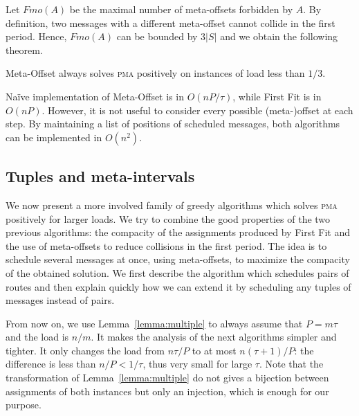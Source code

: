 \documentclass[a4paper,UKenglish,cleveref, autoref, thm-restate]{lipics-v2019}
\newcommand\pma{\textsc{pma}\xspace}
\begin{document}
Let $Fmo(A)$ be the maximal number of meta-offsets forbidden by $A$. 
 By definition, two messages with a different meta-offset cannot collide in the first period.
Hence, $Fmo(A)$ can be bounded by $3|S|$ and we obtain the following theorem.


\begin{theorem}
Meta-Offset always solves \pma positively on instances of load less than $1/3$.
\end{theorem}

Naïve implementation of Meta-Offset is in $O(n P/\tau)$, while First Fit is in $O(nP)$.
However, it is not useful to consider every possible (meta-)offset at each step. By maintaining
a list of positions of scheduled messages, both algorithms can be implemented in $O(n^2)$.

\subsection{Tuples and meta-intervals}

We now present a more involved family of greedy algorithms which 
solves \pma positively for larger loads. We try to combine the good properties of the two previous algorithms: the compacity of the assignments produced by First Fit and the use of meta-offsets to reduce collisions in the first period. The idea is to schedule several messages at once, using meta-offsets, to maximize the compacity of the obtained solution. 
We first describe the algorithm which schedules pairs of routes and then explain quickly how we can extend it by scheduling any tuples of messages instead of pairs.



From now on, we use Lemma~\ref{lemma:multiple} to always assume that $P = m\tau$ and the load is $n/m$. It makes the analysis of the next algorithms simpler and tighter. It only changes the load from $n \tau / P$ to at most $n (\tau +1)/ P$: the difference is less than $n /P < 1/\tau$, thus very small for large $\tau$. Note that the transformation of Lemma~\ref{lemma:multiple} do not gives a bijection between assignments of both instances but only an injection, which is enough for our purpose. 
\end{document}
